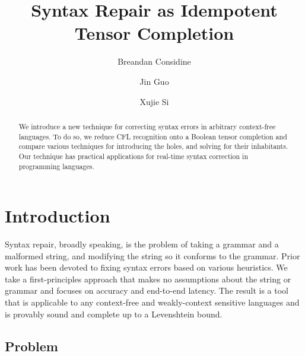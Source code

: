 \documentclass[runningheads]{llncs}
\begin{document}
%
\title{Syntax Repair as Idempotent Tensor Completion}
%
%
\author{Breandan Considine \and
Jin Guo\and
Xujie Si}
%
%
%
\maketitle              %
%
\begin{abstract}

We introduce a new technique for correcting syntax errors in arbitrary context-free languages. To do so, we reduce CFL recognition onto a Boolean tensor completion and compare various techniques for introducing the holes, and solving for their inhabitants. Our technique has practical applications for real-time syntax correction in programming languages.

\end{abstract}

\section{Introduction}

Syntax repair, broadly speaking, is the problem of taking a grammar and a malformed string, and modifying the string so it conforms to the grammar. Prior work has been devoted to fixing syntax errors based on various heuristics. We take a first-principles approach that makes no assumptions about the string or grammar and focuses on accuracy and end-to-end latency. The result is a tool that is applicable to any context-free and weakly-context sensitive languages and is provably sound and complete up to a Levenshtein bound.

\subsection{Problem}
\end{document}
